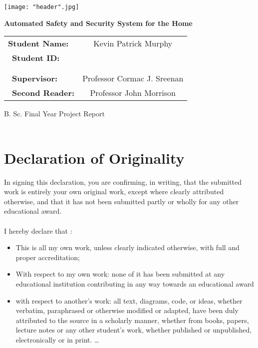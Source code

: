\documentclass{article}
\newcommand{\bigsize}{\fontsize{24pt}{20pt}\selectfont}
\newcommand{\meiumsize}{\fontsize{16pt}{20pt}\selectfont}
\begin{document}
\begin{titlepage}

\centering
\texttt{[image: "header".jpg]}

\vspace{2cm}
{\bigsize \textbf{Automated Safety and Security System for the Home}}
\vspace{2cm}

\begin{table}[H]
\def\arraystretch{2}%
\begin{center}
 \begin{tabular}{ R{5cm} c } 

 {\meiumsize \textbf{Student Name:}} & {\meiumsize Kevin Patrick Murphy}
 \\\
 {\meiumsize \textbf{Student ID:}} & {\meiumsize 111314826} 
 \\\\\\\
 {\meiumsize \textbf{Supervisor:}} & {\meiumsize Professor Cormac J. Sreenan} 
 \\\
 {\meiumsize \textbf{Second Reader:}} & {\meiumsize Professor John Morrison}
 
\end{tabular}
\end{center}
\end{table}

\vspace{2cm}

\begin{center}
{\meiumsize B. Sc. Final Year Project Report}\\
\vspace{1cm}
{\meiumsize 2015}\\
\end{center}

\end{titlepage}

\section*{Declaration of Originality}
In signing this declaration, you are confirming, in writing, that the submitted work is entirely your own original work, except where clearly attributed otherwise, and that it has not been submitted partly or wholly for any other educational award.\\\\
I hereby declare that :
\begin{itemize}
  \item This is all my own work, unless clearly indicated otherwise, with full and proper accreditation;
  \item With respect to my own work: none of it has been submitted at any educational institution contributing in any way towards an educational award
  \item with respect to another\rq s work: all text, diagrams, code, or ideas, whether verbatim, paraphrased or otherwise modified or adapted, have been duly attributed to the source in a scholarly manner, whether from books, papers, lecture notes or any other student\rq s work, whether published or unpublished, electronically or in print.  \ldots
\end{itemize}
\end{document}
